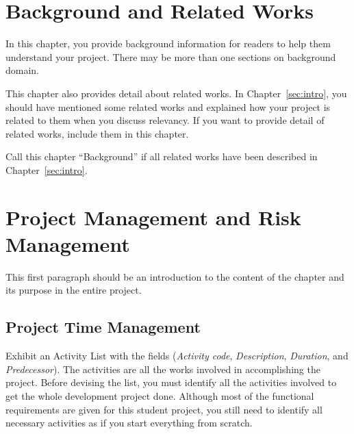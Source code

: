 \documentclass[11pt,a4paper]{article}
\begin{document}
\section{Background and Related Works}
\label{sec:background}

In this chapter, you provide background information for readers to help them understand your project. There may be more than one sections on background domain.

This chapter also provides detail about related works. In Chapter~\ref{sec:intro}, you should have mentioned some related works and explained how your project is related to them when you discuss relevancy. If you want to provide detail of related works, include them in this chapter.

Call this chapter ``Background'' if all related works have been described in Chapter~\ref{sec:intro}.

\section{Project Management and Risk Management}
\label{sec:pm}

This first paragraph should be an introduction to the content of the chapter and its purpose in the entire project.

\subsection{Project Time Management}

Exhibit an Activity List with the fields (\textit{Activity code}, \textit{Description}, \textit{Duration}, and \textit{Predecessor}). The activities are all the works involved in accomplishing the project. Before devising the list, you must identify all the activities involved to get the whole development project done. Although most of the functional requirements are given for this student project, you still need to identify all necessary activities as if you start everything from scratch.
\end{document}
